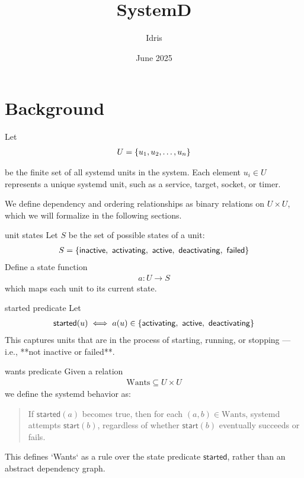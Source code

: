 \documentclass[openany, 12pt]{book}
\title{SystemD}
\author{Idris}
\date{June 2025}
\begin{document}
\tableofcontents

\chapter{Background}

Let
\begin{align*}
	U = \{u_1, u_2, \dots, u_n\}
\end{align*}

be the finite set of all systemd units in the system. Each element $u_i \in U$
represents a unique systemd unit, such as a service, target, socket, or timer.

We define dependency and ordering relationships as binary relations on $U
	\times U$, which we will formalize in the following sections.

\begin{definition}{unit states}{}
	Let $S$ be the set of possible states of a unit:
	\begin{align*}
		S = \set{ \mathsf{inactive},\ \mathsf{activating},\ \mathsf{active},\ \mathsf{deactivating},\ \mathsf{failed}}
	\end{align*}
	Define a state function
	\begin{align*}
		a : U \to S
	\end{align*}
	which maps each unit to its current state.
\end{definition}

\begin{definition}{started predicate}{}
	Let
	\begin{align*}
		\mathsf{started}(u) \iff a(u) \in \set{ \mathsf{activating},\ \mathsf{active},\ \mathsf{deactivating}}
	\end{align*}
	This captures units that are in the process of starting, running, or
	stopping — i.e., **not inactive or failed**.
\end{definition}

\begin{definition}{wants predicate}{}
	Given a relation
	\begin{align*}
		\text{Wants} \subseteq U \times U
	\end{align*}
	we define the systemd behavior as:

	\begin{quote}
		If $\mathsf{started}(a)$ becomes true, then for each $(a, b) \in
			\text{Wants}$, systemd attempts $\mathsf{start}(b)$, regardless of
		whether $\mathsf{start}(b)$ eventually succeeds or fails.
	\end{quote}

	This defines `Wants` as a rule over the state predicate $\mathsf{started}$,
	rather than an abstract dependency graph.
\end{definition}

\end{document}
